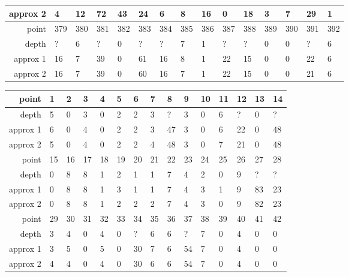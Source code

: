 \begin{center}
\begin{supertabular}{|r|l l l l l l l l l l l l l l|}
approx 2 & 4 & 12 & 72 & 43 & 24 & 6 & 8 & 16 & 0 & 18 & 3 & 7 & 29 & 1 \\
\hline
point & 379 & 380 & 381 & 382 & 383 & 384 & 385 & 386 & 387 & 388 & 389 & 390 & 391 & 392 \\
\hline
depth & ? & 6 & ? & 0 & ? & ? & 7 & 1 & ? & ? & 0 & 0 & ? & 6 \\
approx 1 & 16 & 7 & 39 & 0 & 61 & 16 & 8 & 1 & 22 & 15 & 0 & 0 & 22 & 6 \\
approx 2 & 16 & 7 & 39 & 0 & 60 & 16 & 7 & 1 & 22 & 15 & 0 & 0 & 21 & 6 \\
  \end{supertabular}
  \label{tab:test.auto5d}
\end{center}

\begin{center}
  \tablefirsthead{\hline}
  \tablelasttail{\hline}
  \begin{supertabular}{|r|l l l l l l l l l l l l l l|}
\hline
point & 1 & 2 & 3 & 4 & 5 & 6 & 7 & 8 & 9 & 10 & 11 & 12 & 13 & 14 \\
\hline
depth & 5 & 0 & 3 & 0 & 2 & 2 & 3 & ? & 3 & 0 & 6 & ? & 0 & ? \\
approx 1 & 6 & 0 & 4 & 0 & 2 & 2 & 3 & 47 & 3 & 0 & 6 & 22 & 0 & 48 \\
approx 2 & 5 & 0 & 4 & 0 & 2 & 2 & 4 & 48 & 3 & 0 & 7 & 21 & 0 & 48 \\
\hline
point & 15 & 16 & 17 & 18 & 19 & 20 & 21 & 22 & 23 & 24 & 25 & 26 & 27 & 28 \\
\hline
depth & 0 & 8 & 8 & 1 & 2 & 1 & 1 & 7 & 4 & 2 & 0 & 9 & ? & ? \\
approx 1 & 0 & 8 & 8 & 1 & 3 & 1 & 1 & 7 & 4 & 3 & 1 & 9 & 83 & 23 \\
approx 2 & 0 & 8 & 8 & 1 & 2 & 2 & 2 & 7 & 4 & 3 & 0 & 9 & 82 & 23 \\
\hline
point & 29 & 30 & 31 & 32 & 33 & 34 & 35 & 36 & 37 & 38 & 39 & 40 & 41 & 42 \\
\hline
depth & 3 & 4 & 0 & 4 & 0 & ? & 6 & 6 & ? & 7 & 0 & 4 & 0 & 0 \\
approx 1 & 3 & 5 & 0 & 5 & 0 & 30 & 7 & 6 & 54 & 7 & 0 & 4 & 0 & 0 \\
approx 2 & 4 & 4 & 0 & 4 & 0 & 30 & 6 & 6 & 54 & 7 & 0 & 4 & 0 & 0 \\

\end{supertabular}
\end{center}
